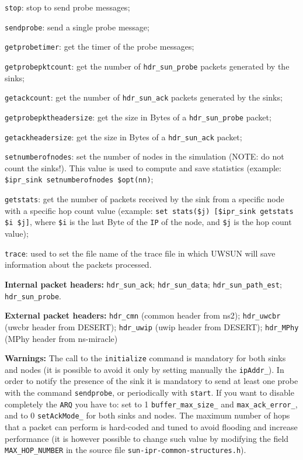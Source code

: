 \begin{description}
\begin{description}
    \item {\tt stop}: stop to send probe messages;
    \item {\tt sendprobe}: send a single probe message;
    \item {\tt getprobetimer}: get the timer of the probe messages;
    \item {\tt getprobepktcount}: get the number of {\tt hdr\_sun\_probe} packets generated by the sinks;
    \item {\tt getackcount}: get the number of {\tt hdr\_sun\_ack} packets generated by the sinks;
    \item {\tt getprobepktheadersize}: get the size in Bytes of a {\tt hdr\_sun\_probe} packet;  
    \item {\tt getackheadersize}: get the size in Bytes of a {\tt hdr\_sun\_ack} packet;
    \item {\tt setnumberofnodes}: set the number of nodes in the simulation (NOTE: do not count the sinks!). This value is used to compute and save statistics (example: {\tt \$ipr\_sink setnumberofnodes \$opt(nn)};
    \item {\tt getstats}: get the number of packets received by the sink from a specific node with a specific hop count value (example: {\tt set stats(\$j) [\$ipr\_sink getstats \$i \$j]}, where {\tt \$i} is the last Byte of the {\tt IP} of the node, and {\tt \$j} is the hop count value);
    \item {\tt trace}: used to set the file name of the trace file in which UWSUN will save information about the packets processed.
    \end{description} 
   \item {\bf Internal packet headers:} {\tt hdr\_sun\_ack}; {\tt hdr\_sun\_data}; {\tt hdr\_sun\_path\_est}; {\tt hdr\_sun\_probe}.
   \item {\bf External packet headers:} {\tt hdr\_cmn} (common header from ns2); {\tt hdr\_uwcbr} (uwcbr header from DESERT); {\tt hdr\_uwip} (uwip header from DESERT); {\tt hdr\_MPhy} (MPhy header from ns-miracle)
   \item {\bf Warnings:} The call to the {\tt initialize} command is mandatory for both sinks and nodes (it is possible to avoid it only by setting manually the {\tt ipAddr\_}). In order to notify the presence of the sink it is mandatory to send at least one probe with the command {\tt sendprobe}, or periodically with {\tt start}. If you want to disable completely the {\tt ARQ} you have to: set to 1 {\tt buffer\_max\_size\_} and {\tt max\_ack\_error\_}, and to 0 {\tt setAckMode\_} for both sinks and nodes. The maximum number of hops that a packet can perform is hard-coded and tuned to avoid flooding and increase performance (it is however possible to change such value by modifying the field {\tt MAX\_HOP\_NUMBER} in the source file {\tt sun-ipr-common-structures.h}).

\end{description}
